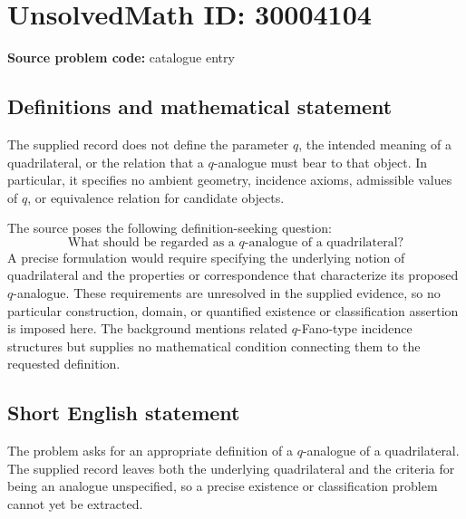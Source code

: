 \documentclass[11pt]{article}
\begin{document}
\section*{UnsolvedMath ID: 30004104}
\textbf{Source problem code:} catalogue entry
\subsection{Definitions and mathematical statement}
The supplied record does not define the parameter \(q\), the intended meaning of a quadrilateral, or the relation that a \(q\)-analogue must bear to that object. In particular, it specifies no ambient geometry, incidence axioms, admissible values of \(q\), or equivalence relation for candidate objects.

The source poses the following definition-seeking question:
\[
\text{What should be regarded as a }q\text{-analogue of a quadrilateral?}
\]
A precise formulation would require specifying the underlying notion of quadrilateral and the properties or correspondence that characterize its proposed \(q\)-analogue. These requirements are unresolved in the supplied evidence, so no particular construction, domain, or quantified existence or classification assertion is imposed here. The background mentions related \(q\)-Fano-type incidence structures but supplies no mathematical condition connecting them to the requested definition.
\subsection{Short English statement}
The problem asks for an appropriate definition of a \(q\)-analogue of a quadrilateral. The supplied record leaves both the underlying quadrilateral and the criteria for being an analogue unspecified, so a precise existence or classification problem cannot yet be extracted.
\end{document}
